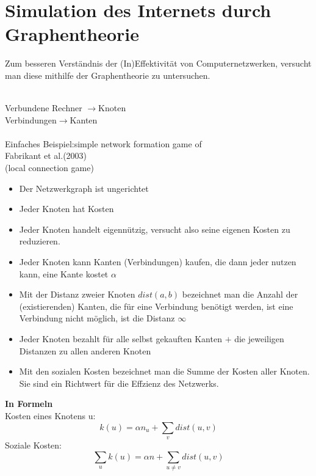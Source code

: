\documentclass[a4paper]{article}
\begin{document}
\section{Simulation des Internets durch Graphentheorie}
Zum besseren Verst\"andnis der (In)Effektivit\"at von Computernetzwerken, versucht man diese mithilfe der Graphentheorie zu untersuchen.
\begin{tabbing}
\hspace{5cm}\=\\
Verbundene Rechner \>$\longrightarrow$Knoten\\
Verbindungen\>$\longrightarrow$Kanten\\\\
Einfaches Beispiel:\>simple network formation game of\\\> Fabrikant et al.(2003) \\\>(local connection game)
\end{tabbing}
\begin{itemize}
        \item Der Netzwerkgraph ist ungerichtet
        \item Jeder Knoten hat Kosten
        \item Jeder Knoten handelt eigenn\"utzig, versucht also seine eigenen Kosten zu reduzieren.
        \item Jeder Knoten kann Kanten (Verbindungen) kaufen, die dann jeder nutzen kann, eine Kante kostet $\alpha$
        \item Mit der Distanz zweier Knoten $dist(a,b)$ bezeichnet man die Anzahl der (existierenden) Kanten, die f\"ur eine Verbindung ben\"otigt werden, ist eine Verbindung nicht m\"oglich, ist die Distanz $\infty$
        \item Jeder Knoten bezahlt f\"ur alle selbst gekauften Kanten $+$ die jeweiligen Distanzen zu allen anderen Knoten
        \item Mit den sozialen Kosten bezeichnet man die Summe der Kosten aller Knoten. Sie sind ein Richtwert f\"ur die Effzienz des Netzwerks.
\end{itemize}
\vspace{1cm}
\textbf{In Formeln}\\
Kosten eines Knotens u:
\[k(u)=\alpha n_u + {\sum}_v dist(u,v)\]
Soziale Kosten:
\[{\sum}_u k(u)= \alpha n + {\sum}_{u\not=v} dist (u,v)\]
\vspace{1cm}
\end{document}
